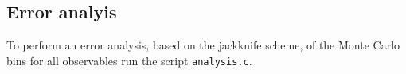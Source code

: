 \subsection{Error analyis}

To perform an error analysis, based on the jackknife scheme, of the Monte Carlo bins for all observables run the script \texttt{analysis.c}.

% 
% 
% 



